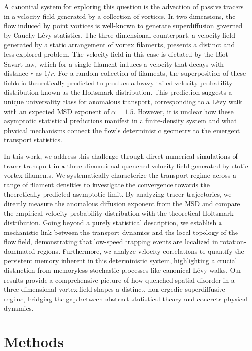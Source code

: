 \documentclass[]{article}
\begin{document}
A canonical system for exploring this question is the advection of passive tracers in a velocity field generated by a collection of vortices. In two dimensions, the flow induced by point vortices is well-known to generate superdiffusion governed by Cauchy-Lévy statistics. The three-dimensional counterpart, a velocity field generated by a static arrangement of vortex filaments, presents a distinct and less-explored problem. The velocity field in this case is dictated by the Biot-Savart law, which for a single filament induces a velocity that decays with distance $r$ as $1/r$. For a random collection of filaments, the superposition of these fields is theoretically predicted to produce a heavy-tailed velocity probability distribution known as the Holtsmark distribution. This prediction suggests a unique universality class for anomalous transport, corresponding to a Lévy walk with an expected MSD exponent of $\alpha = 1.5$. However, it is unclear how these asymptotic statistical predictions manifest in a finite-density system and what physical mechanisms connect the flow's deterministic geometry to the emergent transport statistics.

In this work, we address this challenge through direct numerical simulations of tracer transport in a three-dimensional quenched velocity field generated by static vortex filaments. We systematically characterize the transport regime across a range of filament densities to investigate the convergence towards the theoretically predicted asymptotic limit. By analyzing tracer trajectories, we directly measure the anomalous diffusion exponent from the MSD and compare the empirical velocity probability distribution with the theoretical Holtsmark distribution. Going beyond a purely statistical description, we establish a mechanistic link between the transport dynamics and the local topology of the flow field, demonstrating that low-speed trapping events are localized in rotation-dominated regions. Furthermore, we analyze velocity correlations to quantify the persistent memory inherent in this deterministic system, highlighting a crucial distinction from memoryless stochastic processes like canonical Lévy walks. Our results provide a comprehensive picture of how quenched spatial disorder in a three-dimensional vortex field shapes a distinct, non-ergodic superdiffusive regime, bridging the gap between abstract statistical theory and concrete physical dynamics.

\section{Methods}
\label{sec:methods}
\end{document}
